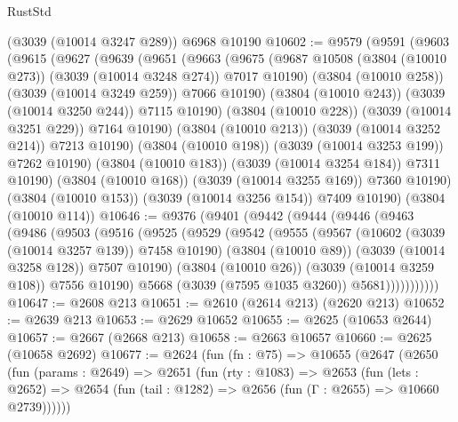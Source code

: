 \begin{lexlean}{RustStd}
\begin{coremodule}
    (@3039 (@10014 @3247 @289))
    @6968
    @10190
@10602 := @9579
    (@9591
      (@9603
        (@9615
          (@9627
            (@9639
              (@9651
                (@9663
                  (@9675
                    (@9687 @10508 (@3804 (@10010 @273)) (@3039 (@10014 @3248 @274)) @7017 @10190)
                    (@3804 (@10010 @258))
                    (@3039 (@10014 @3249 @259))
                    @7066
                    @10190)
                  (@3804 (@10010 @243))
                  (@3039 (@10014 @3250 @244))
                  @7115
                  @10190)
                (@3804 (@10010 @228))
                (@3039 (@10014 @3251 @229))
                @7164
                @10190)
              (@3804 (@10010 @213))
              (@3039 (@10014 @3252 @214))
              @7213
              @10190)
            (@3804 (@10010 @198))
            (@3039 (@10014 @3253 @199))
            @7262
            @10190)
          (@3804 (@10010 @183))
          (@3039 (@10014 @3254 @184))
          @7311
          @10190)
        (@3804 (@10010 @168))
        (@3039 (@10014 @3255 @169))
        @7360
        @10190)
      (@3804 (@10010 @153))
      (@3039 (@10014 @3256 @154))
      @7409
      @10190)
    (@3804 (@10010 @114))
@10646 := @9376
    (@9401
      (@9442
        (@9444
          (@9446
            (@9463
              (@9486
                (@9503
                  (@9516
                    (@9525
                      (@9529
                        (@9542
                          (@9555
                            (@9567
                              (@10602 (@3039 (@10014 @3257 @139)) @7458 @10190)
                              (@3804 (@10010 @89))
                              (@3039 (@10014 @3258 @128))
                              @7507
                              @10190)
                            (@3804 (@10010 @26))
                            (@3039 (@10014 @3259 @108))
                            @7556
                            @10190)
                          @5668
                          (@3039 (@7595 @1035 @3260))
                          @5681)))))))))))
@10647 := @2608 @213
@10651 := @2610 (@2614 @213) (@2620 @213)
@10652 := @2639 @213
@10653 := @2629 @10652
@10655 := @2625 (@10653 @2644)
@10657 := @2667 (@2668 @213)
@10658 := @2663 @10657
@10660 := @2625 (@10658 @2692)
@10677 := @2624
    (fun (fn : @75) =>
    @10655
      (@2647
        (@2650
          (fun (params : @2649) =>
          @2651
            (fun (rty : @1083) =>
            @2653
              (fun (lets : @2652) =>
              @2654 (fun (tail : @1282) => @2656 (fun (Γ : @2655) => @10660 @2739))))))

\end{coremodule}
\end{lexlean}
